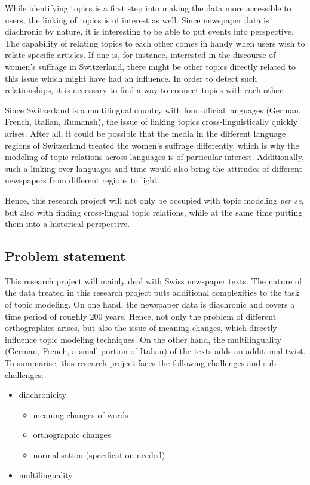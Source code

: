 While identifying topics is a first step into making the data more accessible to users, the linking of topics is of interest as well. Since newspaper data is diachronic by nature, it is interesting to be able to put events into perspective. The capability of relating topics to each other comes in handy when users wish to relate specific articles. If one is, for instance, interested in the discourse of women's suffrage in Switzerland, there might be other topics directly related to this issue which might have had an influence. In order to detect such relationships, it is necessary to find a way to connect topics with each other.

Since Switzerland is a multilingual country with four official languages (German, French, Italian, Rumansh), the issue of linking topics cross-linguistically quickly arises. After all, it could be possible that the media in the different language regions of Switzerland treated the women's suffrage differently, which is why the modeling of topic relations across languages is of particular interest. Additionally, such a linking over languages and time would also bring the attitudes of different newspapers from different regions to light.

Hence, this research project will not only be occupied with topic modeling \textit{per se}, but also with finding cross-lingual topic relations, while at the same time putting them into a historical perspective.

\subsection{Problem statement}
This research project will mainly deal with Swiss newspaper texts. The nature of the data treated in this research project puts additional complexities to the task of topic modeling. On one hand, the newspaper data is diachronic and covers a time period of roughly 200 years. Hence, not only the problem of different orthographies arises, but also the issue of meaning changes, which directly influence topic modeling techniques. On the other hand, the multilinguality (German, French, a small portion of Italian) of the texts adds an additional twist. To summarise, this research project faces the following challenges and sub-challenges:

\begin{itemize}
	\item diachronicity
	\begin{itemize}
		\item meaning changes of words
		\item orthographic changes
		\item normalisation (specification needed)
	\end{itemize}
	\item multilinguality
	
\end{itemize}

